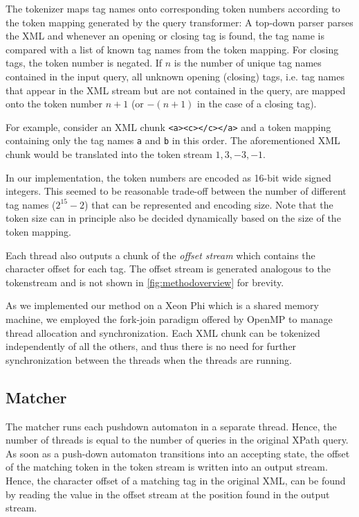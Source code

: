 The tokenizer maps tag names onto corresponding token numbers according to the
token mapping generated by the query transformer: A top-down parser parses the
XML and whenever an opening or closing tag is found, the tag name is compared
with a list of known tag names from the token mapping. For closing tags, the
token number is negated. If $n$ is the number of unique tag names contained in
the input query, all unknown opening (closing) tags, i.e. tag names that appear
in the XML stream but are not contained in the query, are mapped onto the token
number $n+1$ (or $-(n+1)$ in the case of a closing tag).

For example, consider an XML chunk \verb;<a><c></c></a>; and a token mapping
containing only the tag names \verb;a; and \verb;b; in this order. The
aforementioned XML chunk would be translated into the token stream $1, 3, -3,
-1$.

In our implementation, the token numbers are encoded as 16-bit wide signed
integers. This seemed to be reasonable trade-off between the number of different
tag names ($2^{15}-2$) that can be represented and encoding size. Note that the
token size can in principle also be decided dynamically based on the size of the
token mapping.

Each thread also outputs a chunk of the \emph{offset stream} which contains the
character offset for each tag. The offset stream is generated analogous to the
tokenstream and is not shown in \ref{fig:methodoverview} for brevity.

As we implemented our method on a Xeon Phi which is a shared
memory machine, we employed the fork-join paradigm offered by OpenMP to manage
thread allocation and synchronization. Each XML chunk can be tokenized
independently of all the others, and thus there is no need for further
synchronization between the threads when the threads are running.

\subsection{Matcher}

The matcher runs each pushdown automaton in a separate thread. Hence, the
number of threads is equal to the number of queries in the original XPath
query. As soon as a push-down automaton transitions into an accepting state,
the offset of the matching token in the token stream is written into an output
stream. Hence, the character offset of a matching tag in the original XML, can
be found by reading the value in the offset stream at the position found in the
output stream.

